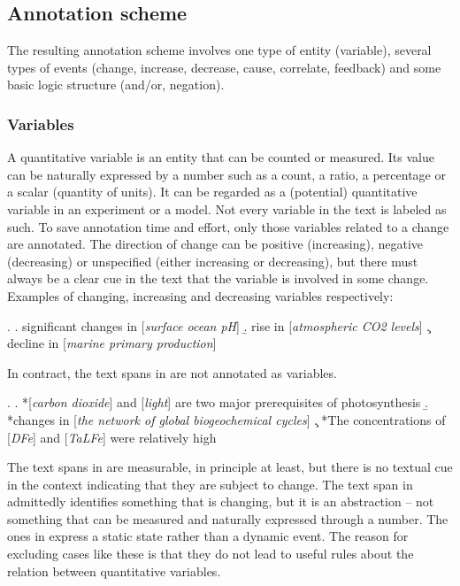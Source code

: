 \documentclass[10pt, a4paper]{article}
\begin{document}
\subsection{Annotation scheme}

The resulting annotation scheme involves one type of entity (variable), several types of events (change, increase, decrease, cause, correlate, feedback) and some basic logic structure (and/or, negation).  


\subsubsection{Variables}

A quantitative variable is an entity that can be counted or measured.
Its value can be naturally expressed by a number such as a count, a ratio, a percentage or a scalar (quantity of units).
It can be regarded as a (potential) quantitative variable in an experiment or a model. 
Not every variable in the text is labeled as such.
To save annotation time and effort, only those variables related to a change are annotated.
The  direction of change can be positive (increasing), negative (decreasing) or unspecified (either increasing or decreasing), but there must always be a clear cue in the text that the variable is involved in some change. 
Examples of changing, increasing and decreasing variables respectively:

\ex.
  \a. significant changes in [\emph{surface ocean pH}]
  \b. rise in [\emph{atmospheric CO2 levels}]
  \c. decline in [\emph{marine primary production}]

In contract, the text spans in \Next are not annotated as variables.

\ex.
  \a. *[\emph{carbon dioxide}] and [\emph{light}] are two major prerequisites of photosynthesis
  \b. *changes in [\emph{the network of global biogeochemical cycles}] 
  \c. *The concentrations of [\emph{DFe}] and [\emph{TaLFe}] were relatively high

The text spans in \Last[a] are measurable, in principle at least, but there is no textual cue in the context indicating that they are subject to change. 
The text span in \Last[b] admittedly identifies something that is changing, but it is an abstraction -- not something that can be measured and naturally expressed through a number. 
The ones in \Last[c] express a static state rather than a dynamic event.
The reason for excluding cases like these is that they do not lead to useful rules about the relation between quantitative variables.
\end{document}
